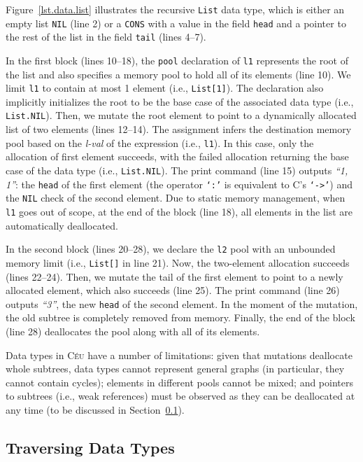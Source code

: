 \documentclass{acm_proc_article-sp}
\newcommand{\CEU}{\textsc{C\'{e}u}\xspace}
\newcommand{\code}[1] {{\small{\texttt{#1}}}}
\begin{document}
Figure~\ref{lst.data.list} illustrates the recursive \code{List} data type, 
which is either an empty list \code{NIL} (line 2) or a \code{CONS} with a value 
in the field \code{head} and a pointer to the rest of the list in the field 
\code{tail} (lines 4--7).

In the first block (lines 10--18), the \code{pool} declaration of \code{l1} 
represents the root of the list and also specifies a memory pool to hold all of 
its elements (line 10).
We limit \code{l1} to contain at most 1 element (i.e., \code{List[1]}).
The declaration also implicitly initializes the root to be the base case of the 
associated data type (i.e., \code{List.NIL}).
Then, we mutate the root element to point to a dynamically allocated list of 
two elements (lines 12--14).
The assignment infers the destination memory pool based on the \emph{l-val} of 
the expression (i.e., \code{l1}).
In this case, only the allocation of first element succeeds, with the failed 
allocation returning the base case of the data type (i.e., \code{List.NIL}).
The print command (line 15) outputs \emph{``1, 1''}: the \code{head} of the 
first element (the operator \code{`:'} is equivalent to C's \code{`->'}) and 
the \code{NIL} check of the second element.
Due to static memory management, when \code{l1} goes out of scope, at the end 
of the block (line 18), all elements in the list are automatically deallocated.

In the second block (lines 20--28), we declare the \code{l2} pool with an
unbounded memory limit (i.e., \code{List[]} in line 21).
Now, the two-element allocation succeeds (lines 22--24).
Then, we mutate the tail of the first element to point to a newly allocated 
element, which also succeeds (line 25).
The print command (line 26) outputs \emph{``3''}, the new \code{head} of the 
second element.
In the moment of the mutation, the old subtree is completely removed from 
memory.
Finally, the end of the block (line 28) deallocates the pool along with all of 
its elements.


Data types in \CEU have a number of limitations:
given that mutations deallocate whole subtrees, data types cannot represent 
general graphs (in particular, they cannot contain cycles);
elements in different pools cannot be mixed;
and pointers to subtrees (i.e., weak references) must be observed as they can 
be deallocated at any time (to be discussed in Section~\ref{sec.traverse}).

\subsection{Traversing Data Types}
\label{sec.traverse}
\end{document}
